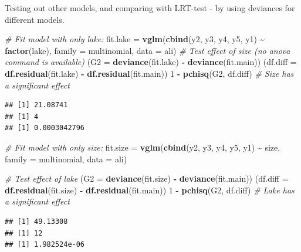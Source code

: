 \documentclass[
  ignorenonframetext,
]{beamer}
\newenvironment{Shaded}{\begin{snugshade}}{\end{snugshade}}
\newcommand{\AttributeTok}[1]{\textcolor[rgb]{0.13,0.29,0.53}{#1}}
\newcommand{\CommentTok}[1]{\textcolor[rgb]{0.56,0.35,0.01}{\textit{#1}}}
\newcommand{\DecValTok}[1]{\textcolor[rgb]{0.00,0.00,0.81}{#1}}
\newcommand{\FunctionTok}[1]{\textcolor[rgb]{0.13,0.29,0.53}{\textbf{#1}}}
\newcommand{\NormalTok}[1]{#1}
\newcommand{\OtherTok}[1]{\textcolor[rgb]{0.56,0.35,0.01}{#1}}
\newcommand{\SpecialCharTok}[1]{\textcolor[rgb]{0.81,0.36,0.00}{\textbf{#1}}}
\begin{document}
\begin{frame}[fragile]
Testing out other models, and comparing with LRT-test - by using
deviances for different models.

\begin{Shaded}
\begin{Highlighting}[]
\CommentTok{\# Fit model with only lake:}
\NormalTok{fit.lake }\OtherTok{=} \FunctionTok{vglm}\NormalTok{(}\FunctionTok{cbind}\NormalTok{(y2, y3, y4, y5, y1) }\SpecialCharTok{\textasciitilde{}} \FunctionTok{factor}\NormalTok{(lake), }\AttributeTok{family =}\NormalTok{ multinomial, }\AttributeTok{data =}\NormalTok{ ali)}
\CommentTok{\# Test effect of size (no anova command is available)}
\NormalTok{(}\AttributeTok{G2 =} \FunctionTok{deviance}\NormalTok{(fit.lake) }\SpecialCharTok{{-}} \FunctionTok{deviance}\NormalTok{(fit.main))}
\NormalTok{(}\AttributeTok{df.diff =} \FunctionTok{df.residual}\NormalTok{(fit.lake) }\SpecialCharTok{{-}} \FunctionTok{df.residual}\NormalTok{(fit.main))}
\DecValTok{1} \SpecialCharTok{{-}} \FunctionTok{pchisq}\NormalTok{(G2, df.diff)}
\CommentTok{\# Size has a significant effect}
\end{Highlighting}
\end{Shaded}

\begin{verbatim}
## [1] 21.08741
## [1] 4
## [1] 0.0003042796
\end{verbatim}
\end{frame}

\begin{frame}[fragile]
\begin{Shaded}
\begin{Highlighting}[]
\CommentTok{\# Fit model with only size:}
\NormalTok{fit.size }\OtherTok{=} \FunctionTok{vglm}\NormalTok{(}\FunctionTok{cbind}\NormalTok{(y2, y3, y4, y5, y1) }\SpecialCharTok{\textasciitilde{}}\NormalTok{ size, }\AttributeTok{family =}\NormalTok{ multinomial, }\AttributeTok{data =}\NormalTok{ ali)}

\CommentTok{\# Test effect of lake}
\NormalTok{(}\AttributeTok{G2 =} \FunctionTok{deviance}\NormalTok{(fit.size) }\SpecialCharTok{{-}} \FunctionTok{deviance}\NormalTok{(fit.main))}
\NormalTok{(}\AttributeTok{df.diff =} \FunctionTok{df.residual}\NormalTok{(fit.size) }\SpecialCharTok{{-}} \FunctionTok{df.residual}\NormalTok{(fit.main))}
\DecValTok{1} \SpecialCharTok{{-}} \FunctionTok{pchisq}\NormalTok{(G2, df.diff)}
\CommentTok{\# Lake has a significant effect}
\end{Highlighting}
\end{Shaded}

\begin{verbatim}
## [1] 49.13308
## [1] 12
## [1] 1.982524e-06
\end{verbatim}
\end{frame}
\end{document}
